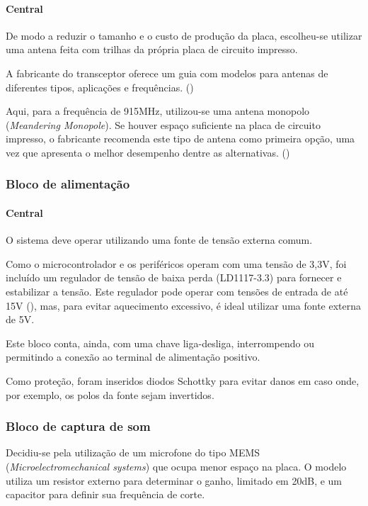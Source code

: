 \documentclass[10pt,a4paper]{article}
\begin{document}
\begin{multicols*}{2}
\paragraph{Central}
De modo a reduzir o tamanho e o custo de produção da placa, escolheu-se utilizar uma antena feita com trilhas da própria placa de circuito impresso.
				
A fabricante do transceptor oferece um guia com modelos para antenas de diferentes tipos, aplicações e frequências.
(\cite{ti_antenas})
				
Aqui, para a frequência de 915MHz, utilizou-se uma antena monopolo (\textit{Meandering Monopole}). Se houver espaço suficiente na placa de circuito impresso, o fabricante recomenda este tipo de antena como primeira opção, uma vez que apresenta o melhor desempenho dentre as alternativas. (\cite{ti_antenas})

\subsubsection{Bloco de alimentação}
\paragraph{Central}
O sistema deve operar utilizando uma fonte de tensão externa comum.
		
Como o microcontrolador e os periféricos operam com uma tensão de 3,3V, foi incluído um regulador de tensão de baixa perda (LD1117-3.3) para fornecer e estabilizar a tensão. Este regulador pode operar com tensões de entrada de até 15V (\cite{ld33_datasheet}), mas, para evitar aquecimento excessivo, é ideal utilizar uma fonte externa de 5V.
		
Este bloco conta, ainda, com uma chave liga-desliga, interrompendo ou permitindo a conexão ao terminal de alimentação positivo.
				
Como proteção, foram inseridos diodos Schottky para evitar danos em caso onde, por exemplo, os polos da fonte sejam invertidos.
			
\subsubsection{Bloco de captura de som}
Decidiu-se pela utilização de um microfone do tipo MEMS (\textit{Microelectromechanical systems}) que ocupa menor espaço na placa.
O modelo utiliza um resistor externo para determinar o ganho, limitado em 20dB, e um capacitor para definir sua frequência de corte.


\end{multicols*}
\end{document}
